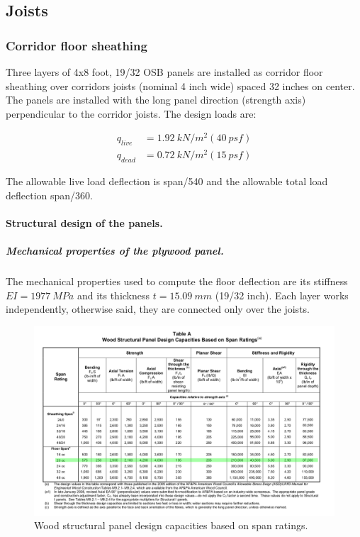 \subsection{Joists}

\subsubsection{Corridor floor sheathing}
Three layers of 4x8 foot, 19/32 OSB panels are installed as corridor floor sheathing over corridors joists (nominal 4 inch wide) spaced 32 inches on center. The panels are installed with the long panel direction (strength axis) perpendicular to the corridor joists. The design loads are:

\begin{align}
  q_{live}&= 1.92\ kN/m^2 (40\ psf) \\
  q_{dead}&= 0.72\ kN/m^2 (15\ psf)
\end{align}

The allowable live load deflection is span/540 and the allowable total load deflection span/360.

\paragraph{Structural design of the panels.}

\subparagraph{Mechanical properties of the plywood panel.}
The mechanical properties used to compute the floor deflection are its stiffness $EI= 1977\ MPa$ and its thickness $t= 15.09\ mm$ (19/32 inch). Each layer works independently, otherwise said, they are connected only over the joists. 

\begin{figure}
  \begin{center}
    \includegraphics[width=120mm]{figures/osb_design_capacities.png}
  \end{center}
  \caption{Wood structural panel design capacities based on span ratings.}\label{fg_osb_design_capacities}
\end{figure}

